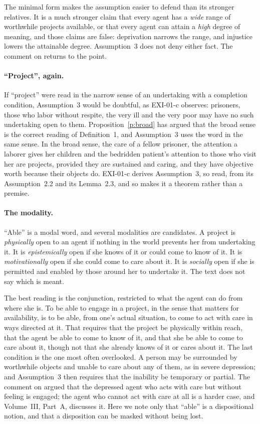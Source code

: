 The minimal form makes the assumption easier to defend than its stronger relatives. It is a much stronger claim that every agent has a \emph{wide} range of worthwhile projects available, or that every agent can attain a \emph{high} degree of meaning, and those claims are false: deprivation narrows the range, and injustice lowers the attainable degree. Assumption~3 does not deny either fact. The comment on  returns to the point.

\paragraph{\enquote{Project}, again.} If \enquote{project} were read in the narrow sense of an undertaking with a completion condition, Assumption~3 would be doubtful, as EXI-01-c observes: prisoners, those who labor without respite, the very ill and the very poor may have no such undertaking open to them. Proposition~\ref{p:broad} has argued that the broad sense is the correct reading of Definition~1, and Assumption~3 uses the word in the same sense. In the broad sense, the care of a fellow prisoner, the attention a laborer gives her children and the bedridden patient's attention to those who visit her are projects, provided they are sustained and caring, and they have objective worth because their objects do. EXI-01-c derives Assumption~3, so read, from its Assumption~2.2 and its Lemma~2.3, and so makes it a theorem rather than a premise.


\paragraph{The modality.} \enquote{Able} is a modal word, and several modalities are candidates. A project is \emph{physically} open to an agent if nothing in the world prevents her from undertaking it. It is \emph{epistemically} open if she knows of it or could come to know of it. It is \emph{motivationally} open if she could come to care about it. It is \emph{socially} open if she is permitted and enabled by those around her to undertake it. The text does not say which is meant.

The best reading is the conjunction, restricted to what the agent can do from where she is. To be able to engage in a project, in the sense that matters for availability, is to be able, from one's actual situation, to come to act with care in ways directed at it. That requires that the project be physically within reach, that the agent be able to come to know of it, and that she be able to come to care about it, though not that she already knows of it or cares about it. The last condition is the one most often overlooked. A person may be surrounded by worthwhile objects and unable to care about any of them, as in severe depression; and Assumption~3 then requires that the inability be temporary or partial. The comment on  argued that the depressed agent who acts with care but without feeling is engaged; the agent who cannot act with care at all is a harder case, and Volume~III, Part~A, discusses it. Here we note only that \enquote{able} is a dispositional notion, and that a disposition can be masked without being lost.

